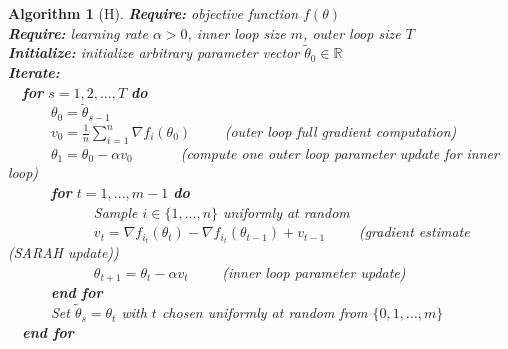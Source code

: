 \documentclass[letterpaper,11 pt]{article}
\newtheorem{algorithm}{Algorithm}
\begin{document}
\begin{algorithm}[H]
\caption{The SARAH algorithm is identical to SVRG except for the \textit{SARAH update}, which modifies the stochastic gradient estimate to use recursive gradient estimate information rather than the initialized gradient to update the gradient estimate in the inner loop.}
\label{alg:sarah}

{\bf Require:}  objective function $f(\theta)$ \\
{\bf Require:} learning rate $\alpha>0$, inner loop size $m$, outer loop size $T$ \\
{\bf Initialize:} initialize arbitrary parameter vector $\tilde{\theta}_{0} \in \mathbb{R}$ \\
{\bf Iterate:} \\
\-\ \-\ {\bf for } $s = 1,2,...,T$ {\bf do} \\
\-\ \-\ \-\ \-\ \-\ \-\  $\theta_0 = \tilde{\theta}_{s-1}$ \\
\-\ \-\ \-\ \-\ \-\ \-\   $v_0 = \frac{1}{n}\sum_{i=1}^{n}{\nabla f_{i}(\theta_0)}$ \-\ \-\ \-\ \-\  (\textit{outer loop full gradient computation}) \\
\-\ \-\ \-\ \-\ \-\ \-\   $\theta_1 = \theta_0 - \alpha v_0$
\-\ \-\ \-\ \-\ \-\ \-\  (\textit{compute one outer loop parameter update for inner loop})  \\
\-\ \-\ \-\ \-\ \-\ \-\  {\bf for } $t = 1,...,m-1$ {\bf do} \\
\-\ \-\ \-\ \-\ \-\ \-\ \-\ \-\ \-\ \-\ \-\ \-\    Sample $i \in \{1,...,n\}$ uniformly at random \\
\-\ \-\ \-\ \-\ \-\ \-\ \-\ \-\ \-\ \-\ \-\ \-\    $v_{t} =   \nabla f_{i_{t}}(\theta_{t})  - \nabla f_{i_{t}}(\theta_{t-1})  + v_{t-1}$    \-\ \-\ \-\ \-\  (\textit{gradient estimate (SARAH update)})  \\
\-\ \-\ \-\ \-\ \-\ \-\ \-\ \-\ \-\ \-\ \-\ \-\   $\theta_{t+1} = \theta_{t} - \alpha v_{t} $ \-\ \-\ \-\ \-\  (\textit{inner loop parameter update}) \\
\-\ \-\ \-\ \-\ \-\ \-\ {\bf end for} \\
\-\ \-\ \-\ \-\ \-\ \-\  Set $\tilde{\theta}_{s} = \theta_{t}$ with $t$ chosen uniformly at random from $\{0,1,...,m\}$  \\
\-\ \-\ {\bf end for }
\end{algorithm}

\pagebreak
\end{document}
